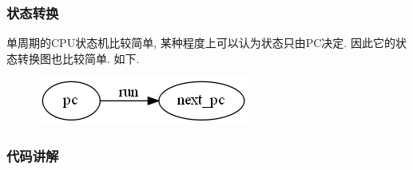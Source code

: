 \documentclass[UTF8]{article}
\begin{document}
\subsubsection{状态转换}
单周期的CPU状态机比较简单, 某种程度上可以认为状态只由PC决定. 因此它的状态转换图也比较简单. 如下.\par
\begin{figure}[H]
	\centering
	\includegraphics[width=\linewidth/5]{phase_diagram.png}
\end{figure}
\subsubsection{代码讲解}
\end{document}

